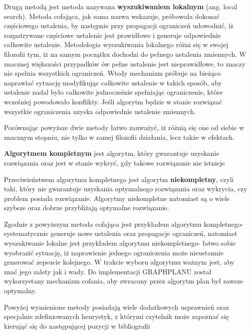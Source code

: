     Drugą metodą jest metoda nazywana \textbf{wyszukiwaniem lokalnym} (ang. local search). Metoda cofająca, jak sama nazwa wskazuje, próbowała dokonać 
    częściowego ustalenia, by następnie przy propagacji ograniczeń udowodnić, iż rozpatrywane częściowe ustalenie jest prawidłowe 
    i generuje odpowiednie całkowite ustalenie. Metodologia wyszukiwania lokalnego różni się w swojej filozofii tym, iż na samym 
    początku dochodzi do pełnego ustalenia zmiennych. W znacznej większości przypadków ów pełne ustalenie jest 
    nieprawidłowe, to znaczy nie spełnia wszystkich ograniczeń. Wtedy mechanizm próbuje na bieżąco naprawiać sytuację modyfikując całkowite ustalenie w takich 
    sposób, aby ustalenie nadal było całkowite jednocześnie spełniając ograniczenie, które wcześniej powodowało konflikty. Jeśli algorytm będzie w stanie 
    rozwiązać wszystkie ograniczenia uzyska odpowiednie ustalenie zmiennych.

    Porównując powyższe dwie metody łatwo zauważyć, iż różnią się one od siebie w znacznym stopniu, nie tylko w samej filozofii działania, lecz także 
    w efektach.

    \begin{definition}
        \label{AlgorytmKompletny}
        \textbf{Algorytmem kompletnym} jest algorytm, który gwarantuje uzyskanie rozwiązania oraz jest w stanie 
        wykryć, gdy takowe rozwiązanie nie istnieje
    \end{definition}

    Przeciwieństwem algorytmu kompletnego jest algorytm \textbf{niekompletny}, czyli taki, który nie gwarantuje 
    uzyskania optymalnego rozwiązania oraz wykrycia, czy problem posiada rozwiązanie. Algorytmy niekompletne natomiast są o wiele 
    szybsze oraz dobrze przybliżają optymalne rozwiązanie. 

    Zgodnie z powyższym metoda cofająca jest przykładem algorytmu kompletnego- systematycznie generuje nowe ustalenia oraz propagacje ograniczeń,
    natomiast wyszukiwanie lokalne jest przykładem algorytmu niekompletnego- łatwo sobie wyobrazić sytuację, iż naprawienie jednego ograniczenia 
    może nieustannie generować zepsucie kolejnego. W trakcie wyboru algorytmu ważnym jest, aby znać jego zalety jak i wady. Do implementacji 
    GRAPHPLANU został wykorzystany mechanizm cofania, aby zwracany przez algorytm plan był zawsze optymalny.



    Powyżej wymienione metody posiadają wiele dodatkowych usprawnień oraz specjalnie zdefiniowanych heurystyk,
    z którymi czytelnik może zapoznać się kierująć się do następującej pozycji w bibliografii \cite{CP}
    
